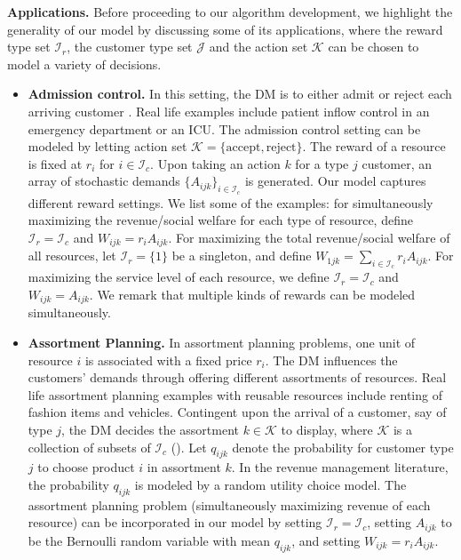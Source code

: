 \documentclass[letterpaper, 10 pt, conference]{ieeeconf}  %
\newcommand{\III}{\mathcal{I}}
\newcommand{\JJJ}{\mathcal{J}}
\newcommand{\KKK}{\mathcal{K}}
\theoremstyle{plain}
\theoremstyle{definition}
\theoremstyle{remark}
\begin{document}
\textbf{Applications.} Before proceeding to our algorithm development, we highlight the generality of our model by discussing some of its applications, where the reward type set $\III_r$, the customer type set $\JJJ$ and the action set $\KKK$ can be chosen to model a variety of decisions. 
\begin{itemize}
\item \textbf{Admission control.} In this setting, the DM is to either admit or reject each arriving customer \cite{levi2010provably}. Real life examples include patient inflow control in an emergency department or an ICU. The admission control setting can be modeled by letting action set $\KKK = \{\text{accept}, \text{reject}\}$. The reward of a resource is fixed at $r_i$ for $i \in \III_c$. Upon taking an action $k$ for a type $j$ customer, an array of stochastic demands $\{A_{ijk}\}_{i \in \III_c}$ is generated. Our model captures different reward settings. We list some of the examples: for simultaneously maximizing the revenue/social welfare for each type of resource, define $\III_r = \III_c$ and $W_{ijk} = r_i A_{ijk}$. For maximizing the total revenue/social welfare of all resources, let $\III_r=\{1\}$ be a singleton, and define $W_{1jk}=\sum_{i \in \III_c} r_i A_{ijk}$. For maximizing the service level of each resource, we define $\III_r = \III_c$ and $W_{ijk} = A_{ijk}$. We remark that multiple kinds of rewards can be modeled simultaneously.
\item \textbf{Assortment Planning.} In assortment planning problems, one unit of resource $i$ is associated with a fixed price $r_i$. The DM influences the customers' demands through offering different assortments of resources. Real life assortment planning examples with reusable resources include renting of fashion items and vehicles. Contingent upon the arrival of a customer, say of type $j$, the DM decides the assortment $k \in \KKK$ to display, where $\KKK$ is a collection of subsets of $\III_c$ (\cite{rusmevichientong2020dynamic,feng2019linear}). Let $q_{ijk}$ denote the probability for customer type $j$ to choose product $i$ in assortment $k$. In the revenue management literature, the probability $q_{ijk}$ is modeled by a random utility choice model. The assortment planning problem (simultaneously maximizing revenue of each resource) can be incorporated in our model by setting $\III_r = \III_c$, setting $A_{ijk}$ to be the Bernoulli random variable with mean $q_{ijk}$, and setting $W_{ijk}=r_i A_{ijk}$.
\end{itemize}
\end{document}
